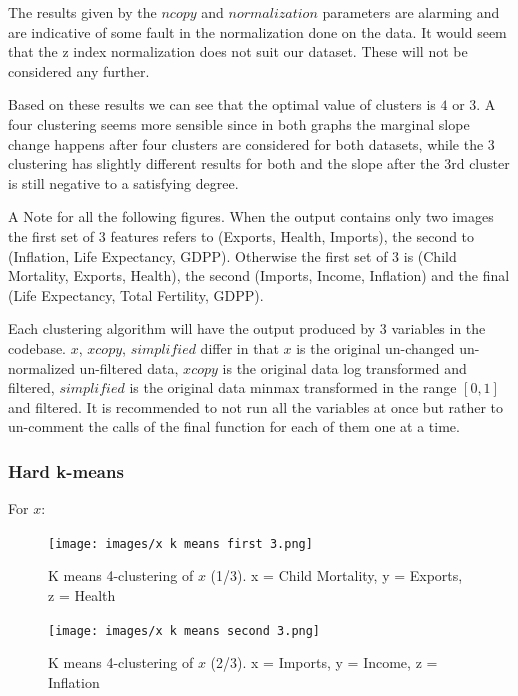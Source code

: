 \documentclass[12pt, a4paper]{article}
\begin{document}
The results given by the $ncopy$ and $normalization$ parameters are alarming and are indicative of some fault in the normalization done on the data. It would seem that the z index normalization does not suit our dataset. These will not be considered any further.
\newline

Based on these results we can see that the optimal value of clusters is $4$ or $3$. A four clustering seems more sensible since in both graphs the marginal slope change happens after four clusters are considered for both datasets, while the 3 clustering has slightly different results for both and the slope after the 3rd cluster is still negative to a satisfying degree.
\newline

A Note for all the following figures. When the output contains only two images the first set of 3 features refers to (Exports, Health, Imports), the second to (Inflation, Life Expectancy, GDPP). Otherwise the first set of 3 is (Child Mortality, Exports, Health), the second (Imports, Income, Inflation) and the final (Life Expectancy, Total Fertility, GDPP).
\newline

Each clustering algorithm will have the output produced by 3 variables in the codebase. $x$, $xcopy$, $simplified$ differ in that $x$ is the original un-changed un-normalized un-filtered data,  $xcopy$ is the original data log transformed and filtered, $simplified$ is the original data minmax transformed in the range $[0,1]$ and filtered. It is recommended to not run all the variables at once but rather to un-comment the calls of the final function for each of them one at a time.
\newline

\subsubsection{Hard k-means}

For $x$:

\begin{figure}[H]
    \centering
    \texttt{[image: images/x k means first 3.png]}
    \caption{K means 4-clustering of $x$ (1/3). x = Child Mortality, y = Exports, z = Health}
    \label{fig:ncopy-optimal}
\end{figure}

\begin{figure}[H]
    \centering
    \texttt{[image: images/x k means second 3.png]}
    \caption{K means 4-clustering of $x$ (2/3). x = Imports, y = Income, z = Inflation}
    \label{fig:ncopy-optimal}
\end{figure}
\end{document}
